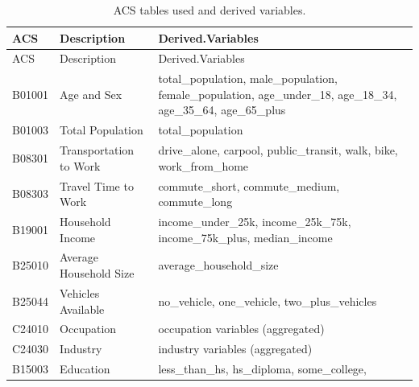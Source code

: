 \documentclass[
  number,
  review,
  3p]{elsarticle}
\begin{document}
\begin{longtable}[]{@{}
  >{\raggedright\arraybackslash}p{}
  >{\raggedright\arraybackslash}p{}
  >{\raggedright\arraybackslash}p{}@{}}
\caption{ACS tables used and derived variables.}\tabularnewline
\toprule\noalign{}
\begin{minipage}[b]{\linewidth}\raggedright
ACS
\end{minipage} & \begin{minipage}[b]{\linewidth}\raggedright
Description
\end{minipage} & \begin{minipage}[b]{\linewidth}\raggedright
Derived.Variables
\end{minipage} \\
\midrule\noalign{}
\endfirsthead
\toprule\noalign{}
\begin{minipage}[b]{\linewidth}\raggedright
ACS
\end{minipage} & \begin{minipage}[b]{\linewidth}\raggedright
Description
\end{minipage} & \begin{minipage}[b]{\linewidth}\raggedright
Derived.Variables
\end{minipage} \\
\midrule\noalign{}
\endhead
\bottomrule\noalign{}
\endlastfoot
B01001 & Age and Sex & total\_population, male\_population,
female\_population, age\_under\_18, age\_18\_34, age\_35\_64,
age\_65\_plus \\
B01003 & Total Population & total\_population \\
B08301 & Transportation to Work & drive\_alone, carpool,
public\_transit, walk, bike, work\_from\_home \\
B08303 & Travel Time to Work & commute\_short, commute\_medium,
commute\_long \\
B19001 & Household Income & income\_under\_25k, income\_25k\_75k,
income\_75k\_plus, median\_income \\
B25010 & Average Household Size & average\_household\_size \\
B25044 & Vehicles Available & no\_vehicle, one\_vehicle,
two\_plus\_vehicles \\
C24010 & Occupation & occupation variables (aggregated) \\
C24030 & Industry & industry variables (aggregated) \\
B15003 & Education & less\_than\_hs, hs\_diploma, some\_college,

\end{longtable}
\end{document}
